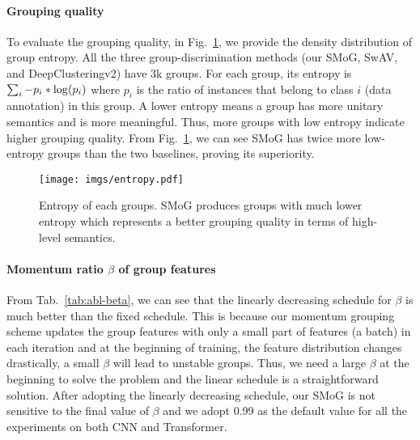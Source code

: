 \documentclass[runningheads]{style/llncs}
\begin{document}
\paragraph{Grouping quality} To evaluate the grouping quality, in Fig.~\ref{fig:entropy}, we provide the density distribution of group entropy. All the three group-discrimination methods (our SMoG, SwAV, and DeepClusteringv2) have 3k groups. For each group, its entropy is $\sum_i -p_i*{\rm log}(p_i)$ where $p_i$ is the ratio of instances that belong to class $i$ (data annotation) in this group. A lower entropy means a group has more unitary semantics and is more meaningful. Thus, more groups with low entropy indicate higher grouping quality. From Fig.~\ref{fig:entropy}, we can see SMoG has twice more low-entropy groups than the two baselines, proving its superiority.

\begin{figure}
	\begin{center}
		\texttt{[image: imgs/entropy.pdf]}
	\end{center}
	\caption{Entropy of each groups. SMoG produces groups with much lower entropy which represents a better grouping quality in terms of high-level semantics.}
	\label{fig:entropy}
\end{figure}

\paragraph{Momentum ratio $\beta$ of group features}
From Tab.~\ref{tab:abl-beta}, we can see that the linearly decreasing schedule for $\beta$ is much better than the fixed schedule. This is because our momentum grouping scheme updates the group features with only a small part of features (a batch) in each iteration and at the beginning of training, the feature distribution changes drastically, a small $\beta$ will lead to unstable groups. Thus, we need a large $\beta$ at the beginning to solve the problem and the linear schedule is a straightforward solution. After adopting the linearly decreasing schedule, our SMoG is not sensitive to the final value of $\beta$ and we adopt 0.99 as the default value for all the experiments on both CNN and Transformer.
\end{document}
